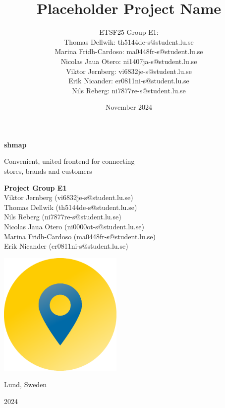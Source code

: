 \documentclass[titlepage]{article}
\title{Placeholder Project Name}
\author{ETSF25 Group E1:\\Thomas Dellwik: th5144de-s@student.lu.se\\Marina Fridh-Cardoso: ma0448fr-s@student.lu.se\\Nicolas Jaua Otero: ni1407ja-s@student.lu.se\\Viktor Jernberg: vi6832je-s@student.lu.se\\Erik Nicander: er0811ni-s@student.lu.se\\Nils Reberg: ni7877re-s@student.lu.se\\
}
\date{November 2024}
\def\companyName{shmap}
\begin{document}
\begin{titlepage}
    \begin{center}
        \vspace*{1.5cm}

        \textbf{{\Huge \companyName}}

        \vspace{0.5cm}
            {\large Convenient, united frontend for connecting\\
        stores, brands and customers}
            
        \vspace{1.25cm}

        \textbf{Project Group E1} \\
        {\normalsize Viktor Jernberg (vi6832je-s@student.lu.se)\\Thomas Dellwik (th5144de-s@student.lu.se)\\Nils Reberg (ni7877re-s@student.lu.se)\\Nicolas Jaua Otero (ni0000ot-s@student.lu.se)\\Marina Fridh-Cardoso (ma0448fr-s@student.lu.se)\\Erik Nicander (er0811ni-s@student.lu.se)}

        \vspace{1.25cm}

        \includegraphics[width=0.45\textwidth]{logo_gradient.png}
       
        \vspace{1.5cm}

        {\Large Lund, Sweden}

        \vspace{0.5cm}
        
        {\Large 2024}\\
            
    \end{center}
\end{titlepage}
\end{document}
